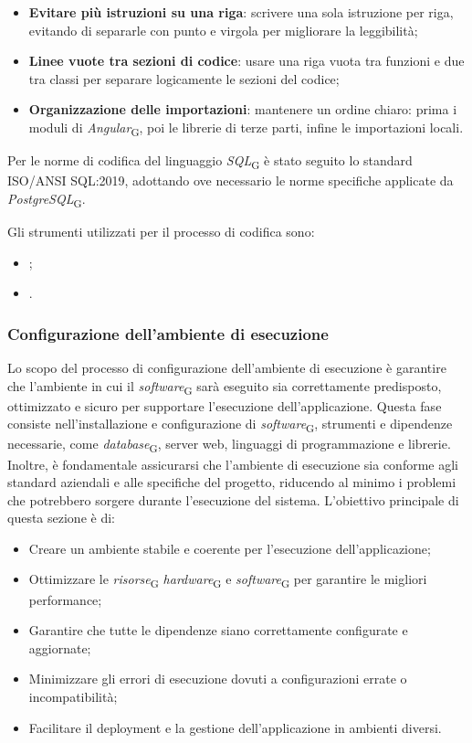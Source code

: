 \begin{itemize}
    \item \textbf{Evitare più istruzioni su una riga}: scrivere una sola istruzione per riga, evitando di separarle con punto e virgola per migliorare la leggibilità;
    \item \textbf{Linee vuote tra sezioni di codice}: usare una riga vuota tra funzioni e due tra classi per separare logicamente le sezioni del codice;
    \item \textbf{Organizzazione delle importazioni}: mantenere un ordine chiaro: prima i moduli di \textit{Angular}\textsubscript{G}, poi le librerie di terze parti, infine le importazioni locali.
\end{itemize}

Per le norme di codifica del linguaggio \textit{SQL}\textsubscript{G} è stato seguito lo standard ISO/ANSI SQL:2019, adottando ove necessario le norme specifiche applicate da \textit{PostgreSQL}\textsubscript{G}.

Gli strumenti utilizzati per il processo di codifica sono:
\begin{itemize}
    \item {};
    \item {}.
\end{itemize}

\subsubsection{Configurazione dell’ambiente di esecuzione}
Lo scopo del processo di configurazione dell'ambiente di esecuzione è garantire che l'ambiente in cui il \textit{software}\textsubscript{G} sarà eseguito sia correttamente predisposto, ottimizzato e sicuro per supportare l'esecuzione dell'applicazione. Questa fase consiste nell'installazione e configurazione di \textit{software}\textsubscript{G}, strumenti e dipendenze necessarie, come \textit{database}\textsubscript{G}, server web, linguaggi di programmazione e librerie. Inoltre, è fondamentale assicurarsi che l'ambiente di esecuzione sia conforme agli standard aziendali e alle specifiche del progetto, riducendo al minimo i problemi che potrebbero sorgere durante l'esecuzione del sistema. L'obiettivo principale di questa sezione è di:
\begin{itemize}
    \item Creare un ambiente stabile e coerente per l'esecuzione dell'applicazione;
    \item Ottimizzare le \textit{risorse}\textsubscript{G} \textit{hardware}\textsubscript{G} e \textit{software}\textsubscript{G} per garantire le migliori performance;
    \item Garantire che tutte le dipendenze siano correttamente configurate e aggiornate;
    \item Minimizzare gli errori di esecuzione dovuti a configurazioni errate o incompatibilità;
    \item Facilitare il deployment e la gestione dell'applicazione in ambienti diversi.
\end{itemize}

